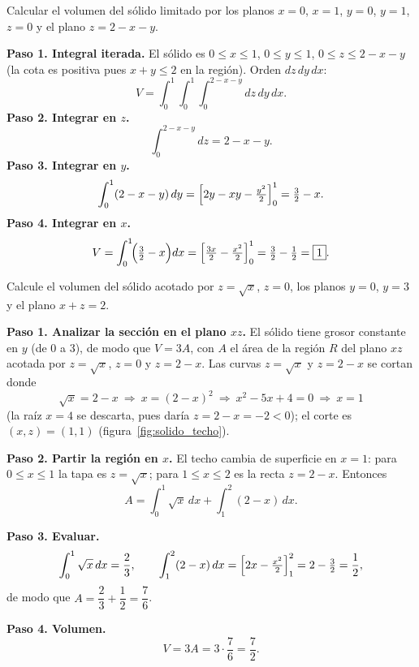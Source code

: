 \begin{prob}
Calcular el volumen del sólido limitado por los planos \(x=0\), \(x=1\), \(y=0\), \(y=1\), \(z=0\) y el plano \(z = 2 - x - y\).
\begin{myproof}
\textbf{Paso 1. Integral iterada.} El sólido es $0\le x\le1$, $0\le y\le1$, $0\le z\le 2-x-y$ (la cota es positiva pues $x+y\le2$ en la región). Orden $dz\,dy\,dx$:
\[
V = \int_0^1\int_0^1\int_0^{2-x-y} dz\,dy\,dx.
\]
\textbf{Paso 2. Integrar en $z$.}
\[
\int_0^{2-x-y} dz = 2-x-y.
\]
\textbf{Paso 3. Integrar en $y$.}
\[
\int_0^1(2-x-y)\,dy
= \Bigl[2y-xy-\tfrac{y^2}{2}\Bigr]_0^1 = \tfrac{3}{2}-x.
\]
\textbf{Paso 4. Integrar en $x$.}
\[
V = \int_0^1\!\Bigl(\tfrac{3}{2}-x\Bigr)dx
= \Bigl[\tfrac{3x}{2}-\tfrac{x^2}{2}\Bigr]_0^1
= \tfrac{3}{2}-\tfrac{1}{2} = \boxed{1}.
\]
\end{myproof}
\end{prob}

\begin{prob}
Calcule el volumen del sólido acotado por $z=\sqrt{x}$, $z=0$, los planos
$y=0$, $y=3$ y el plano $x+z=2$.
\begin{myproof}
\textbf{Paso 1. Analizar la sección en el plano $xz$.}
El sólido tiene grosor constante en $y$ (de $0$ a $3$), de modo que $V=3A$,
con $A$ el área de la región $R$ del plano $xz$ acotada por $z=\sqrt x$,
$z=0$ y $z=2-x$. Las curvas $z=\sqrt x$ y $z=2-x$ se cortan donde
\[
\sqrt x=2-x\ \Rightarrow\ x=(2-x)^2\ \Rightarrow\ x^2-5x+4=0\ \Rightarrow\ x=1
\]
(la raíz $x=4$ se descarta, pues daría $z=2-x=-2<0$); el corte es
$(x,z)=(1,1)$ (figura~\ref{fig:solido_techo}).

\textbf{Paso 2. Partir la región en $x$.}
El techo cambia de superficie en $x=1$: para $0\le x\le 1$ la tapa es
$z=\sqrt x$; para $1\le x\le 2$ es la recta $z=2-x$. Entonces
\[
A=\int_0^1\sqrt{x}\,dx+\int_1^2(2-x)\,dx.
\]

\textbf{Paso 3. Evaluar.}
\[
\int_0^1\sqrt x\,dx=\frac23,\qquad
\int_1^2(2-x)\,dx=\Bigl[2x-\tfrac{x^2}{2}\Bigr]_1^2=2-\tfrac32=\frac12,
\]
de modo que $A=\dfrac23+\dfrac12=\dfrac76$.

\textbf{Paso 4. Volumen.}
\[
V=3A=3\cdot\frac76=\boxed{\dfrac{7}{2}}.
\]
\end{myproof}
\end{prob}

